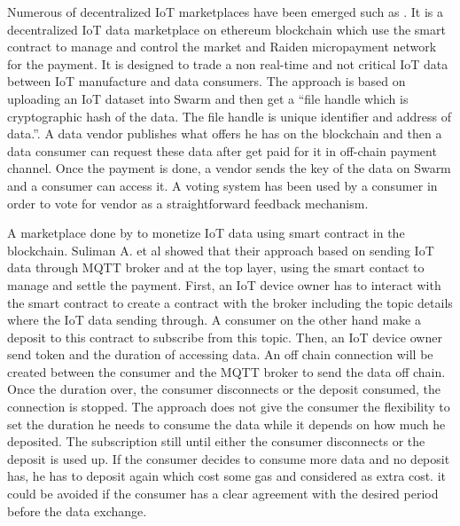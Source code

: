 \documentclass[letterpaper, 10 pt, conference]{ieeeconf}  %
\begin{document}
Numerous of decentralized IoT marketplaces  have been emerged such as \cite{18}. It is a decentralized IoT data marketplace on ethereum blockchain which use the smart contract to manage and control the market and Raiden micropayment network for the payment. It is designed to trade a non real-time and not critical IoT data between IoT manufacture and data consumers. The approach is based on uploading an IoT dataset into Swarm and then get a “file handle which is cryptographic hash of the data. The file handle is unique identifier and address of data.”. A data vendor publishes what offers he has on the blockchain and then a data consumer can request these data after get paid for it in off-chain payment channel. Once the payment is done, a vendor sends the key of the data on Swarm and a consumer can access it. A voting system has been used by a consumer in order to vote for vendor as a straightforward feedback mechanism. 

A marketplace done by \cite{19} to monetize IoT data using smart contract in the blockchain. Suliman A. et al \cite{19} showed that their approach based on sending IoT data through MQTT broker and at the top layer, using the smart contact to manage and settle the payment. First, an IoT device owner has to interact with the smart contract to create a contract with the broker including the topic details where the IoT data sending through. A consumer on the other hand make a deposit to this contract to subscribe from this topic. Then, an IoT device owner send token and the duration of accessing data. An off chain connection will be created between the consumer and the MQTT broker to send the data off chain. Once the duration over, the consumer disconnects or the deposit consumed, the connection is stopped. The approach does not give the consumer the flexibility to set the duration he needs to consume the data while it depends on how much he deposited. The subscription still until either the consumer disconnects or the deposit is used up. If the consumer decides to consume more data and no deposit has, he has to deposit again which cost some gas and considered as extra cost. it could be avoided if the consumer has a clear agreement with the desired period before the data exchange.
\end{document}
